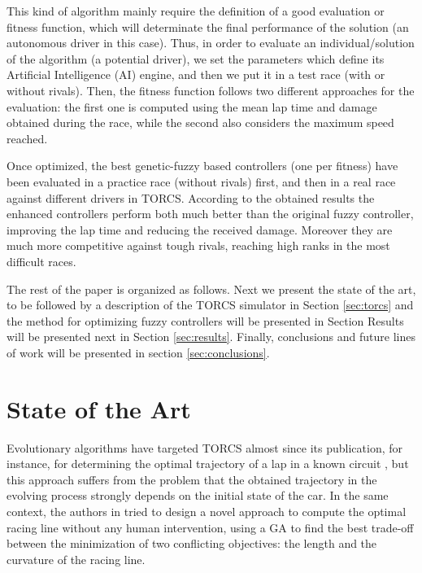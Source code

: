 \documentclass[conference]{IEEEtran}
\begin{document}
This kind of algorithm mainly require the definition of a good evaluation or fitness function, which will determinate the final performance of the solution (an autonomous driver in this case).
Thus, in order to evaluate an individual/solution of the algorithm (a potential driver), we set the parameters which define its Artificial Intelligence (AI) engine, and then we put it in a test race (with or without rivals).
Then, the fitness function follows two different approaches for the evaluation: the first one is computed using the mean lap time and damage obtained during the race, while the second also considers the maximum speed reached.

Once optimized, the best genetic-fuzzy based controllers (one per fitness) have been evaluated in a practice race (without rivals) first, and then in a real race against different drivers in TORCS. 
According to the obtained results the enhanced controllers perform both much better than the original fuzzy controller, improving the lap time and reducing the received damage. Moreover they are much more competitive against tough rivals, reaching high ranks in the most difficult races.


The rest of the paper is organized as follows. Next we present the
state of the art, to be followed by a description of the TORCS
simulator in Section \ref{sec:torcs} and the
method for optimizing fuzzy controllers will be presented in Section
Results will be presented next in Section \ref{sec:results}. Finally, conclusions and future lines of work will
be presented in section \ref{sec:conclusions}.



\section{State of the Art}
\label{sec:soa}

Evolutionary algorithms have targeted TORCS almost since its
publication, for instance, for determining the
optimal trajectory of a lap in a known circuit \cite{drivingGA2008},
but this approach suffers from the problem that the obtained
trajectory in the evolving process strongly depends on the initial
state of the car.  
In the same context, the authors in \cite{GaRaceLine2010} tried to design a novel approach to compute the optimal racing line without any human intervention, using a GA to find the best trade-off between
the minimization of two conflicting objectives: the length and
the curvature of the racing line.
\end{document}
